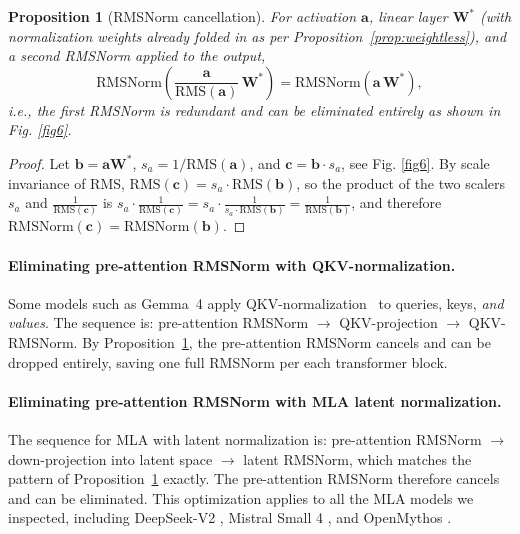 \documentclass{article}
\newtheorem{proposition}{Proposition}
\begin{document}
\begin{proposition}[RMSNorm cancellation]\label{prop:rms-cancel}
For activation $\mathbf{a}$, linear layer $\mathbf{W}^*$ (with normalization weights
already folded in as per Proposition~\ref{prop:weightless}), and a second RMSNorm
applied to the output,
\[
  \mathrm{RMSNorm}\!\left(\frac{\mathbf{a}}{\mathrm{RMS}(\mathbf{a})}\,\mathbf{W}^*\right)
  = \mathrm{RMSNorm}\!\left(\mathbf{a}\,\mathbf{W}^*\right),
\]
i.e., the first RMSNorm is redundant and can be eliminated entirely as shown in Fig. \ref{fig6}.
\end{proposition}
\begin{proof}
Let $\mathbf{b} = \mathbf{a}\mathbf{W}^*$, $s_a = 1/\mathrm{RMS}(\mathbf{a})$, and
$\mathbf{c} = \mathbf{b} \cdot s_a$, see Fig. \ref{fig6}.  By scale invariance of RMS,
$\mathrm{RMS}(\mathbf{c}) = s_a \cdot \mathrm{RMS}(\mathbf{b})$, so the product of the two scalers $s_a$
and $\frac{1}{\mathrm{RMS}(\mathbf{c})}$ is $s_a \cdot \frac{1}{\mathrm{RMS}(\mathbf{c})}
= s_a \cdot \frac{1}{s_a \cdot \mathrm{RMS}(\mathbf{b})} = \frac{1}{\mathrm{RMS}(\mathbf{b})}$,
and therefore $\mathrm{RMSNorm}(\mathbf{c}) = \mathrm{RMSNorm}(\mathbf{b})$.
\end{proof}
\paragraph{Eliminating pre-attention RMSNorm with QKV-normalization.}
Some models such as Gemma~4 \citep{gemma4} apply QKV-normalization~\citep{qkv-norm} to
queries, keys, \emph{and values}. The sequence is:
pre-attention RMSNorm $\to$ QKV-projection $\to$ QKV-RMSNorm.
By Proposition~\ref{prop:rms-cancel}, the pre-attention RMSNorm cancels and can be
dropped entirely, saving one full RMSNorm per each transformer block.

\paragraph{Eliminating pre-attention RMSNorm with MLA latent normalization.}
The sequence for MLA with latent normalization is:
pre-attention RMSNorm $\to$ down-projection into latent space $\to$ latent RMSNorm,
which matches the pattern of Proposition~\ref{prop:rms-cancel} exactly.
The pre-attention RMSNorm therefore cancels and can be eliminated.
This optimization applies to all the MLA models we inspected, including
DeepSeek-V2 \citep{deepseek-v2}, Mistral Small 4 \citep{mistral4}, and
OpenMythos \citep{openMythos}.
\end{document}

